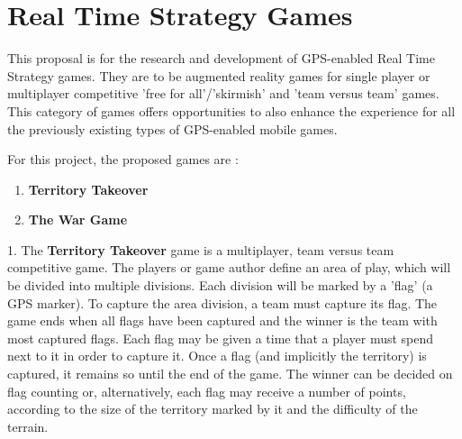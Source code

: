 \documentclass{article}
\begin{document}
\section{Real Time Strategy Games}

This proposal is for the research and development of GPS-enabled Real Time
Strategy games. They are to be augmented reality games for single player or
multiplayer competitive 'free for all'/'skirmish' and 'team versus team'
games. This category of games offers opportunities to also enhance the
experience for all the previously existing types of GPS-enabled mobile games.

For this project, the proposed games are :
\begin{enumerate}	
	\item \textbf{Territory Takeover}
	\item \textbf{The War Game}
\end{enumerate}

1. The \textbf{Territory Takeover} game is a multiplayer, team versus team
competitive game. The players or game author define an area of play, which will
be divided into multiple divisions. Each division will be marked by a 'flag' (a
GPS marker). To capture the area division, a team must capture its flag. The
game ends when all flags have been captured and the winner is the team with most
captured flags. Each flag may be given a time that a player must spend next to
it in order to capture it. Once a flag (and implicitly the territory) is
captured, it remains so until the end of the game. The winner can be decided on
flag counting or, alternatively, each flag may receive a number of points,
according to the size of the territory marked by it and the difficulty of the
terrain. \newline
\end{document}
